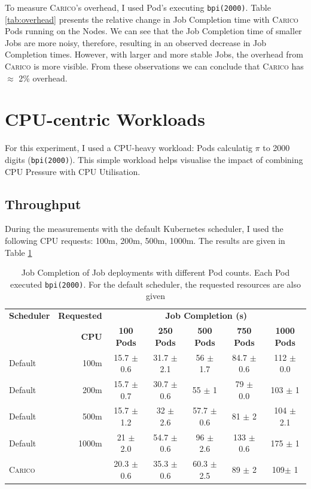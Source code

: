 To measure \textsc{Carico}'s overhead, I used Pod's executing \texttt{bpi(2000)}. Table
\ref{tab:overhead} presents the relative change in Job Completion time with
\textsc{Carico} Pods running on the Nodes. We can see that the Job Completion time of
smaller Jobs are more noisy, therefore, resulting in an observed decrease in Job
Completion times. However, with larger and more stable Jobs, the overhead from
\textsc{Carico} is more visible. From these observations we can conclude that \textsc{Carico} has
$\approx$ 2\% overhead.
%
\section{CPU-centric Workloads}
\label{sec:eval-cpu-centric}
For this experiment, I used a CPU-heavy workload: Pods calculatig $\pi$ to 2000
digits (\texttt{bpi(2000)}). This simple workload helps visualise the impact of
combining CPU Pressure with CPU Utilisation.

\subsection{Throughput}
During the measurements with the default Kubernetes scheduler, I used the
following CPU requests: 100m, 200m, 500m, 1000m. The results are given in Table
\ref{tab:pi-2000-throughput}

\begin{table}[H]
\centering
    \begin{tabular}{|l|r|c|c|c|c|c|}
    \hline
    \textbf{Scheduler} & \textbf{Requested} & \multicolumn{5}{c|}{\textbf{Job Completion (s)}} \\
    \cline{2-7}
    &  \textbf{CPU} & \textbf{100 Pods} & \textbf{250 Pods} & \textbf{500 Pods} & \textbf{750 Pods} & \textbf{1000 Pods} \\
    \hline
    Default & 100m & 15.7 $\pm$ 0.6 & 31.7 $\pm$ 2.1 & 56 $\pm$ 1.7 & 84.7 $\pm$
        0.6 & 112 $\pm$ 0.0 \\
    Default & 200m & 15.7 $\pm$ 0.7 & 30.7 $\pm$ 0.6 & 55 $\pm$ 1 & 79 $\pm$ 0.0
        & 103 $\pm$ 1 \\
    Default & 500m & 15.7 $\pm$ 1.2 & 32 $\pm$ 2.6 & 57.7 $\pm$ 0.6 & 81 $\pm$ 2
        & 104 $\pm$ 2.1 \\
    Default & 1000m & 21 $\pm$ 2.0 & 54.7 $\pm$ 0.6 & 96 $\pm$ 2.6 & 133 $\pm$
        0.6 & 175 $\pm$ 1 \\
    \textsc{Carico} &  & 20.3 $\pm$ 0.6 & 35.3 $\pm$ 0.6 & 60.3 $\pm$ 2.5 & 89 $\pm$ 2 &
        109$\pm$ 1 \\
    \hline
    \end{tabular}
    \caption{Job Completion of Job deployments with different Pod counts. Each
    Pod executed \texttt{bpi(2000)}. For the default scheduler, the requested
    resources are also given}
    \label{tab:pi-2000-throughput}
\end{table}

